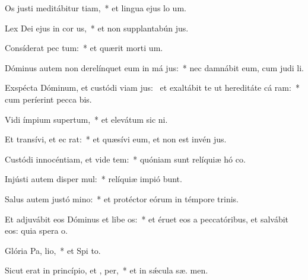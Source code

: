 \item Os justi meditábitur tiam,~* et lingua ejus lo um.
\item Lex Dei ejus in cor us,~* et non supplantabún  jus.
\item Consíderat pec tum:~* et quærit morti um.
\item Dóminus autem non derelínquet eum in má jus:~* nec damnábit eum, cum judi li.
\item Exspécta Dóminum, et custódi viam jus:~\pscross{} et exaltábit te ut hereditáte cá ram:~* cum períerint pecca bis.
\item Vidi ímpium supertum,~* et elevátum sic  ni.
\item Et transívi, et ec  rat:~* et quæsívi eum, et non est invén  jus.
\item Custódi innocéntiam, et vide tem:~* quóniam sunt relíquiæ hó co.
\item Injústi autem disper mul:~* relíquiæ impió bunt.
\item Salus autem justó  mino:~* et protéctor eórum in témpore trinis.
\item Et adjuvábit eos Dóminus et libe os:~* et éruet eos a peccatóribus, et salvábit eos: quia spera  o.
\item Glória Pa,  lio,~* et Spi to.
\item Sicut erat in princípio, et ,  per,~* et in sǽcula sæ. men.
